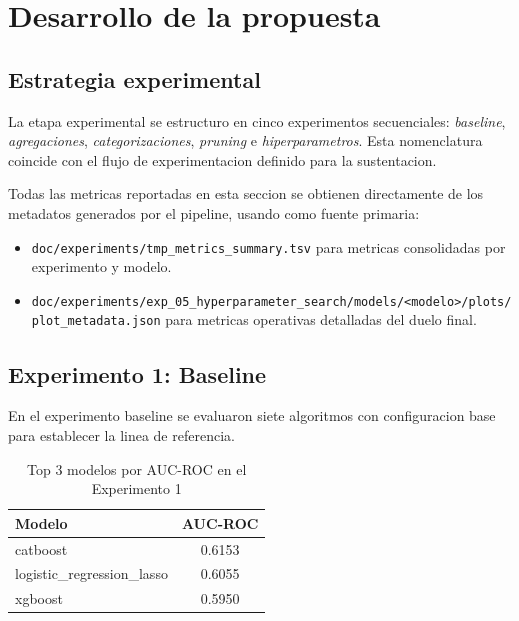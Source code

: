 \section{Desarrollo de la propuesta}

\subsection{Estrategia experimental}

La etapa experimental se estructuro en cinco experimentos secuenciales: \textit{baseline}, \textit{agregaciones}, \textit{categorizaciones}, \textit{pruning} e \textit{hiperparametros}. Esta nomenclatura coincide con el flujo de experimentacion definido para la sustentacion.

Todas las metricas reportadas en esta seccion se obtienen directamente de los metadatos generados por el pipeline, usando como fuente primaria:

\begin{itemize}
\item \texttt{doc/experiments/tmp\_metrics\_summary.tsv} para metricas consolidadas por experimento y modelo.
\item \texttt{doc/experiments/exp\_05\_hyperparameter\_search/models/<modelo>/plots/plot\_metadata.json} para metricas operativas detalladas del duelo final.
\end{itemize}

\subsection{Experimento 1: Baseline}

En el experimento baseline se evaluaron siete algoritmos con configuracion base para establecer la linea de referencia.

\begin{table}[H]
\centering
\caption{Top 3 modelos por AUC-ROC en el Experimento 1}
\label{tab:exp1-top3}
\begin{tabular}{|l|c|}
\hline
\textbf{Modelo} & \textbf{AUC-ROC} \\ \hline
catboost & 0.6153 \\ \hline
logistic\_regression\_lasso & 0.6055 \\ \hline
xgboost & 0.5950 \\ \hline
\end{tabular}
\end{table}

